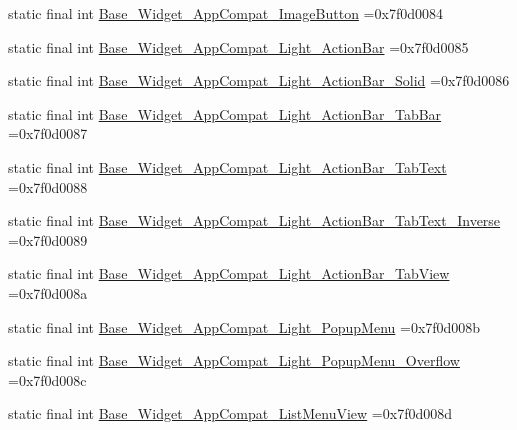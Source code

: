 \begin{DoxyCompactItemize}
static final int \mbox{\hyperlink{classcom_1_1example_1_1trainawearapplication_1_1_r_1_1style_abee258196b2c9d221ea966debbbe706f}{Base\+\_\+\+Widget\+\_\+\+App\+Compat\+\_\+\+Image\+Button}} =0x7f0d0084
\item 
static final int \mbox{\hyperlink{classcom_1_1example_1_1trainawearapplication_1_1_r_1_1style_a2b4eab61a866a38c131cf8bccfda02ed}{Base\+\_\+\+Widget\+\_\+\+App\+Compat\+\_\+\+Light\+\_\+\+Action\+Bar}} =0x7f0d0085
\item 
static final int \mbox{\hyperlink{classcom_1_1example_1_1trainawearapplication_1_1_r_1_1style_a47dc8551ec4c8be6411c5fe7425d3292}{Base\+\_\+\+Widget\+\_\+\+App\+Compat\+\_\+\+Light\+\_\+\+Action\+Bar\+\_\+\+Solid}} =0x7f0d0086
\item 
static final int \mbox{\hyperlink{classcom_1_1example_1_1trainawearapplication_1_1_r_1_1style_aea438081bc428d236ba902ab4e38546f}{Base\+\_\+\+Widget\+\_\+\+App\+Compat\+\_\+\+Light\+\_\+\+Action\+Bar\+\_\+\+Tab\+Bar}} =0x7f0d0087
\item 
static final int \mbox{\hyperlink{classcom_1_1example_1_1trainawearapplication_1_1_r_1_1style_ac582d4744eb384e33a3e57a43a406302}{Base\+\_\+\+Widget\+\_\+\+App\+Compat\+\_\+\+Light\+\_\+\+Action\+Bar\+\_\+\+Tab\+Text}} =0x7f0d0088
\item 
static final int \mbox{\hyperlink{classcom_1_1example_1_1trainawearapplication_1_1_r_1_1style_aa2c36b4ca1ea8f7789e3f62327995750}{Base\+\_\+\+Widget\+\_\+\+App\+Compat\+\_\+\+Light\+\_\+\+Action\+Bar\+\_\+\+Tab\+Text\+\_\+\+Inverse}} =0x7f0d0089
\item 
static final int \mbox{\hyperlink{classcom_1_1example_1_1trainawearapplication_1_1_r_1_1style_afb461c6d148ca6b6891ba32179416c11}{Base\+\_\+\+Widget\+\_\+\+App\+Compat\+\_\+\+Light\+\_\+\+Action\+Bar\+\_\+\+Tab\+View}} =0x7f0d008a
\item 
static final int \mbox{\hyperlink{classcom_1_1example_1_1trainawearapplication_1_1_r_1_1style_a1a7798eeaf6c88073342ced776a6abc6}{Base\+\_\+\+Widget\+\_\+\+App\+Compat\+\_\+\+Light\+\_\+\+Popup\+Menu}} =0x7f0d008b
\item 
static final int \mbox{\hyperlink{classcom_1_1example_1_1trainawearapplication_1_1_r_1_1style_a33e69ec4d1c03166adb777eb4f646909}{Base\+\_\+\+Widget\+\_\+\+App\+Compat\+\_\+\+Light\+\_\+\+Popup\+Menu\+\_\+\+Overflow}} =0x7f0d008c
\item 
static final int \mbox{\hyperlink{classcom_1_1example_1_1trainawearapplication_1_1_r_1_1style_adf6835ca2a2ffffb103467cf99c7aecb}{Base\+\_\+\+Widget\+\_\+\+App\+Compat\+\_\+\+List\+Menu\+View}} =0x7f0d008d

\end{DoxyCompactItemize}
